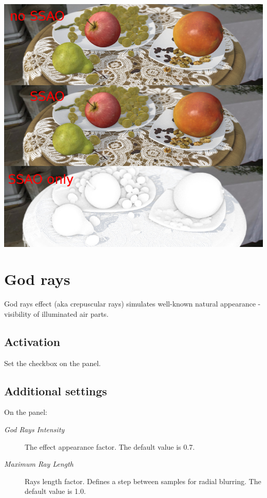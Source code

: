 \documentclass[a4paper,12pt,oneside]{sphinxmanual}
\begin{document}
{\hfill\includegraphics[width=1.000\linewidth]{ssao.jpg}\hfill}

\begin{DUlineblock}{0em}
\item[] 
\end{DUlineblock}


\section{God rays}
\label{postprocessing_effects:god-rays}\label{postprocessing_effects:id11}\label{postprocessing_effects:index-3}
God rays effect (aka crepuscular rays) simulates well-known natural appearance - visibility of illuminated air parts.


\subsection{Activation}
\label{postprocessing_effects:id12}
Set the  checkbox on the  panel.


\subsection{Additional settings}
\label{postprocessing_effects:id13}
On the  panel:
\begin{description}
\item[{\emph{God Rays Intensity}}] \leavevmode
The effect appearance factor. The default value is 0.7.

\item[{\emph{Maximum Ray Length}}] \leavevmode
Rays length factor. Defines a step between samples for radial blurring. The default value is 1.0.

\end{description}
\end{document}

